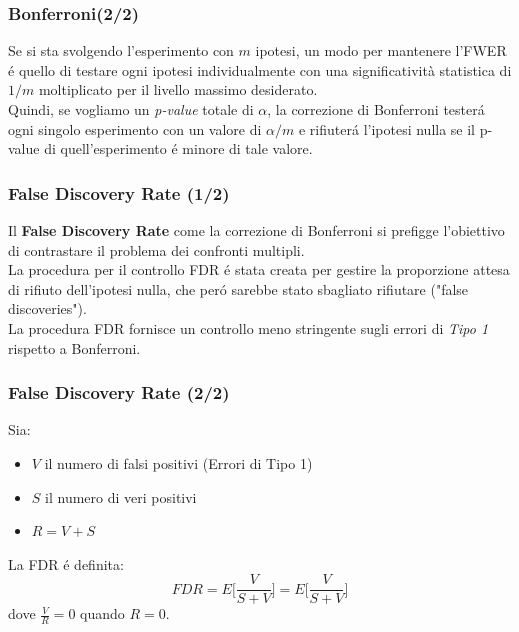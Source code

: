 \documentclass{beamer}
\begin{document}
\begin{frame}
\frametitle{Bonferroni(2/2)}
Se si sta svolgendo l'esperimento con $m$ ipotesi, un modo per mantenere l'FWER \'e quello di testare ogni ipotesi individualmente con una significatività statistica di $1/m$ moltiplicato per il livello massimo desiderato.
\\ \medskip
Quindi, se vogliamo un \emph{p-value} totale di $\alpha$, la correzione di Bonferroni tester\'a ogni singolo esperimento con un valore di $\alpha/m$ e rifiuter\'a l'ipotesi nulla se il p-value di quell'esperimento \'e minore di tale valore.
\end{frame}

\begin{frame}
\frametitle{False Discovery Rate (1/2)}
Il \textbf{False Discovery Rate} come la correzione di Bonferroni si prefigge l'obiettivo di contrastare il problema dei confronti multipli.\\
\smallskip
La procedura per il controllo FDR \'e stata creata per gestire la proporzione attesa di rifiuto dell'ipotesi nulla,  che per\'o sarebbe stato sbagliato rifiutare ("false discoveries").\\
\smallskip
La procedura FDR fornisce un controllo meno stringente sugli errori di \textit{Tipo 1} rispetto a Bonferroni.
\end{frame}

\begin{frame}
\frametitle{False Discovery Rate (2/2)}
Sia:
\begin{itemize}
\item $V$ il numero di falsi positivi (Errori di Tipo 1)
\item $S$ il numero di veri positivi 
\item $R =  V+S$ 
\end{itemize}
La FDR \'e definita:
\begin{equation*}
FDR = E\Big[\frac{V}{S+V}\Big] = E\Big[\frac{V}{S+V}\Big]
\end{equation*}
dove $\frac{V}{R} = 0$ quando $R = 0$.
\end{frame}
\end{document}
